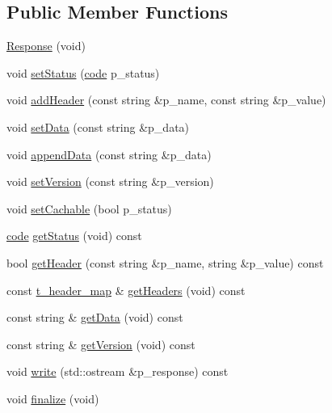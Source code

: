 \subsection*{Public Member Functions}
\begin{DoxyCompactItemize}
\item 
\hyperlink{classxtd_1_1network_1_1http_1_1Response_af4135d35d1d5c7e15b8ec11b0fee4510}{Response} (void)
\item 
void \hyperlink{classxtd_1_1network_1_1http_1_1Response_ae2a9c98f18509685efbd3b1c2dc40eee}{set\-Status} (\hyperlink{namespacextd_1_1network_1_1http_a55148922a7d13fe756e53e2ccad4b89c}{code} p\-\_\-status)
\item 
void \hyperlink{classxtd_1_1network_1_1http_1_1Response_a053c5cac11eae3d2280bd37e7b4c5777}{add\-Header} (const string \&p\-\_\-name, const string \&p\-\_\-value)
\item 
void \hyperlink{classxtd_1_1network_1_1http_1_1Response_abac2c9458d9552f9e615954a8d79c666}{set\-Data} (const string \&p\-\_\-data)
\item 
void \hyperlink{classxtd_1_1network_1_1http_1_1Response_a5c1dd78f683d9660cdb6f28a8ed4fd7c}{append\-Data} (const string \&p\-\_\-data)
\item 
void \hyperlink{classxtd_1_1network_1_1http_1_1Response_a9f4e8bb7eff6b869f87d59fe2ffbb224}{set\-Version} (const string \&p\-\_\-version)
\item 
void \hyperlink{classxtd_1_1network_1_1http_1_1Response_a0d6c9e21cc552494caae85314a723ae9}{set\-Cachable} (bool p\-\_\-status)
\item 
\hyperlink{namespacextd_1_1network_1_1http_a55148922a7d13fe756e53e2ccad4b89c}{code} \hyperlink{classxtd_1_1network_1_1http_1_1Response_a88aaaeda4df83751a5462746610033a1}{get\-Status} (void) const 
\item 
bool \hyperlink{classxtd_1_1network_1_1http_1_1Response_a7d8bdc82b82ed044802f1730552f1f07}{get\-Header} (const string \&p\-\_\-name, string \&p\-\_\-value) const 
\item 
const \hyperlink{classxtd_1_1network_1_1http_1_1Response_a77c534464429597bc4faa6bb556a8b53}{t\-\_\-header\-\_\-map} \& \hyperlink{classxtd_1_1network_1_1http_1_1Response_a46b741dc86559dd3207172056aca2565}{get\-Headers} (void) const 
\item 
const string \& \hyperlink{classxtd_1_1network_1_1http_1_1Response_a20be1955a089359fce4696150824698e}{get\-Data} (void) const 
\item 
const string \& \hyperlink{classxtd_1_1network_1_1http_1_1Response_ab80064478837b568a09f6dbcaebb1307}{get\-Version} (void) const 
\item 
void \hyperlink{classxtd_1_1network_1_1http_1_1Response_a9d561a52d0f3c852872532de31be7785}{write} (std\-::ostream \&p\-\_\-response) const 
\item 
void \hyperlink{classxtd_1_1network_1_1http_1_1Response_ae492d91828580c9421cf18a4efa92bba}{finalize} (void)
\end{DoxyCompactItemize}
